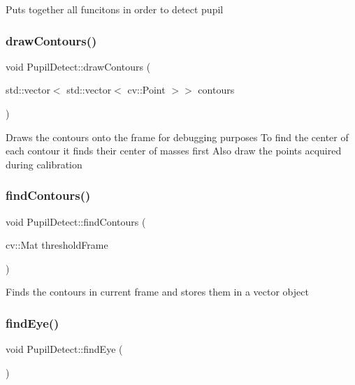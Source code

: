 Puts together all funcitons in order to detect pupil \mbox{\label{class_pupil_detect_aa1e4390aead747da32a2f1aaf077da68}} 
\subsubsection{\texorpdfstring{draw\+Contours()}{drawContours()}}
{\footnotesize\ttfamily void Pupil\+Detect\+::draw\+Contours (\begin{DoxyParamCaption}\item[{std\+::vector$<$ std\+::vector$<$ cv\+::\+Point $>$$>$}]{contours }\end{DoxyParamCaption})\hspace{0.3cm}{\ttfamily [private]}}

Draws the contours onto the frame for debugging purposes To find the center of each contour it finds their center of masses first Also draw the points acquired during calibration \mbox{\label{class_pupil_detect_ab852b491f3da3294e89d25777653e20f}} 
\subsubsection{\texorpdfstring{find\+Contours()}{findContours()}}
{\footnotesize\ttfamily void Pupil\+Detect\+::find\+Contours (\begin{DoxyParamCaption}\item[{cv\+::\+Mat}]{threshold\+Frame }\end{DoxyParamCaption})\hspace{0.3cm}{\ttfamily [private]}}

Finds the contours in current frame and stores them in a vector object \mbox{\label{class_pupil_detect_ab1bc03f4007d91e575b349659119c70a}} 
\subsubsection{\texorpdfstring{find\+Eye()}{findEye()}}
{\footnotesize\ttfamily void Pupil\+Detect\+::find\+Eye (\begin{DoxyParamCaption}{ }\end{DoxyParamCaption})}

